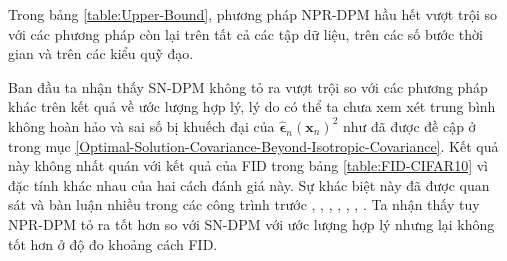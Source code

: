 \documentclass[14pt, a4paper]{article}
\numberwithin{equation}{section}
\numberwithin{figure}{section}
\numberwithin{dl}{section}
\numberwithin{md}{section}
\numberwithin{bd}{section}
\numberwithin{dn}{section}
\numberwithin{hq}{section}
\begin{document}
    Trong bảng \ref{table:Upper-Bound}, phương pháp NPR-DPM hầu hết vượt trội so với các phương pháp còn lại trên tất cả các tập dữ liệu, trên các số bước thời gian và trên các kiểu quỹ đạo.

    \begin{table}[h!]
        \caption{Số bước nhỏ nhất để đạt được khoảng cách FID khoảng bằng 6.
        Chi phí thời gian trong từng bước cho từng phương pháp xem như là như nhau.
        Phương pháp của ta có thêm mạng dự đoán phần dư nhiễu NPR hoặc mạng dự đoán bình phương nhiễu SN vì vậy sẽ tăng thêm chi phí thời gian.
        Ta nhân kết quả với tỷ lệ chi phí thời gian trên từng bước so với các phương pháp được so sánh}
        \begin{center}
        \end{center}
        \label{table:Smallest-steps-to-achieved-FID-6}
    \end{table}

    Ban đầu ta nhận thấy SN-DPM không tỏ ra vượt trội so với các phương pháp khác trên kết quả về ước lượng hợp lý,
    lý do có thể ta chưa xem xét trung bình không hoàn hảo và sai số bị khuếch đại của $\hat{\boldsymbol{\epsilon}}_n (\boldsymbol{x}_n)^2$ như đã được đề cập ở trong mục \ref{Optimal-Solution-Covariance-Beyond-Isotropic-Covariance}.
    Kết quả này không nhất quán với kết quả của FID trong bảng \ref{table:FID-CIFAR10} vì đặc tính khác nhau của hai cách đánh giá này.
    Sự khác biệt này đã được quan sát và bàn luận nhiều trong các công trình trước \cite{ho2020denoising}, \cite{nichol2021improved}, \cite{song2021maximum}, \cite{vahdat2021score}, \cite{watson2021learning}, \cite{kingma2021variational}, \cite{bao2021analytic}.
    Ta nhận thấy tuy NPR-DPM tỏ ra tốt hơn so với SN-DPM với ước lượng hợp lý nhưng lại không tốt hơn ở độ đo khoảng cách FID.
\end{document}
